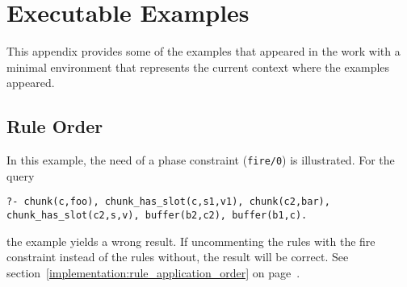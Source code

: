 \chapter{Executable Examples}

This appendix provides some of the examples that appeared in the work with a minimal environment that represents the current context where the examples appeared.

\section{Rule Order}
\label{app:ex:rule_order}

In this example, the need of a phase constraint (\lstinline|fire/0|) is illustrated. For the query

\begin{lstlisting}
?- chunk(c,foo), chunk_has_slot(c,s1,v1), chunk(c2,bar), chunk_has_slot(c2,s,v), buffer(b2,c2), buffer(b1,c).
\end{lstlisting}

the example yields a wrong result. If uncommenting the rules with the fire constraint instead of the rules without, the result will be correct. See section~\ref{implementation:rule_application_order} on page~\pageref{implementation:rule_application_order}.

\raggedbottom

